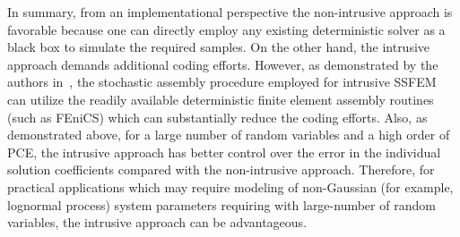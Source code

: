 \documentclass[letter,1p,11pt,oneside,onecolumn,sort&compress]{elsarticle}
\begin{document}

In summary, from an implementational perspective the non-intrusive approach is favorable because one can directly employ any existing deterministic solver as a black box to simulate the required samples. On the other hand, the intrusive approach demands %
additional coding efforts. However, as demonstrated by the authors in~\cite{desai2017scalable,desai2019scalable}, the stochastic assembly procedure employed for intrusive SSFEM can utilize the readily available deterministic finite element assembly routines (such as FEniCS) which can substantially reduce the coding efforts.
Also, as demonstrated above, for a large number of random variables and a high order of PCE, the intrusive approach has better control over the error in the individual solution coefficients compared with the non-intrusive approach. Therefore, for practical applications which may require modeling of non-Gaussian (for example, lognormal process) system parameters requiring with large-number of random variables, the intrusive approach can be advantageous.
\end{document}

